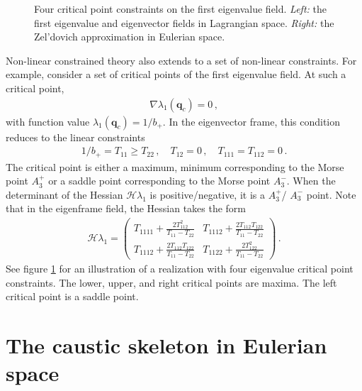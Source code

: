 \documentclass[a4paper, 11pt]{article}
\begin{document}
\begin{figure}
\begin{subfigure}[b]{0.46\textwidth}
\end{subfigure}
\caption{Four critical point constraints on the first eigenvalue field. \textit{Left:} the first eigenvalue and eigenvector fields in Lagrangian space. \textit{Right:} the Zel'dovich approximation in Eulerian space.}\label{fig:composite}
\end{figure}

Non-linear constrained theory also extends to a set of non-linear constraints. For example, consider a set of critical points of the first eigenvalue field. At such a critical point, 
\begin{align}
\nabla \lambda_1(\bm{q}_c) = 0\,,
\end{align}
with function value $\lambda_1(\bm{q}_c)=1/b_+$. In the eigenvector frame, this condition reduces to the linear constraints
\begin{align}
1/b_+ = T_{11} \geq T_{22}\,, \quad  T_{12}=0\,,\quad T_{111}=T_{112}=0\,.
\end{align}
The critical point is either a maximum, minimum corresponding to the Morse point $A_3^+$ or a saddle point corresponding to the Morse point $A_3^-$. When the determinant of the Hessian $\mathcal{H}\lambda_1$ is positive/negative, it is a $A_3^+$/ $A_3^-$ point. Note that in the eigenframe field, the Hessian takes the form
\begin{align}
\mathcal{H}\lambda_1 = 
\begin{pmatrix} 
T_{1111}+\frac{2T_{112}^2}{T_{11}-T_{22}} & T_{1112} + \frac{2 T_{112}T_{122}}{T_{11}-T_{22}} \\
T_{1112}+\frac{2 T_{112}T_{122}}{T_{11}-T_{22}} & T_{1122} + \frac{2 T_{122}^2}{T_{11}-T_{22}}
\end{pmatrix}\,.
\end{align}
See figure \ref{fig:composite} for an illustration of a realization with four eigenvalue critical point constraints. The lower, upper, and right critical points are maxima. The left critical point is a saddle point.




\newpage
\section{The caustic skeleton in Eulerian space}








\newpage  
\end{document}

